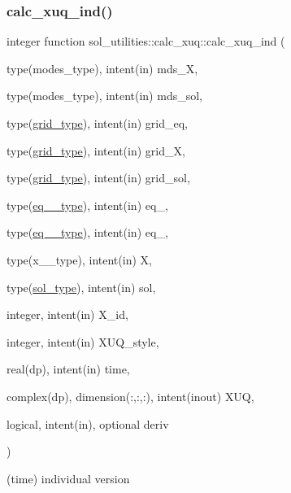 \subsubsection{\texorpdfstring{calc\+\_\+xuq\+\_\+ind()}{calc\_xuq\_ind()}}
{\footnotesize\ttfamily integer function sol\+\_\+utilities\+::calc\+\_\+xuq\+::calc\+\_\+xuq\+\_\+ind (\begin{DoxyParamCaption}\item[{type(modes\+\_\+type), intent(in)}]{mds\+\_\+X,  }\item[{type(modes\+\_\+type), intent(in)}]{mds\+\_\+sol,  }\item[{type(\hyperlink{structgrid__vars_1_1grid__type}{grid\+\_\+type}), intent(in)}]{grid\+\_\+eq,  }\item[{type(\hyperlink{structgrid__vars_1_1grid__type}{grid\+\_\+type}), intent(in)}]{grid\+\_\+X,  }\item[{type(\hyperlink{structgrid__vars_1_1grid__type}{grid\+\_\+type}), intent(in)}]{grid\+\_\+sol,  }\item[{type(\hyperlink{structeq__vars_1_1eq__1__type}{eq\+\_\+1\+\_\+type}), intent(in)}]{eq\+\_,  }\item[{type(\hyperlink{structeq__vars_1_1eq__2__type}{eq\+\_\+2\+\_\+type}), intent(in)}]{eq\+\_,  }\item[{type(x\+\_\+1\+\_\+type), intent(in)}]{X,  }\item[{type(\hyperlink{structsol__vars_1_1sol__type}{sol\+\_\+type}), intent(in)}]{sol,  }\item[{integer, intent(in)}]{X\+\_\+id,  }\item[{integer, intent(in)}]{X\+U\+Q\+\_\+style,  }\item[{real(dp), intent(in)}]{time,  }\item[{complex(dp), dimension(\+:,\+:,\+:), intent(inout)}]{X\+UQ,  }\item[{logical, intent(in), optional}]{deriv }\end{DoxyParamCaption})}



(time) individual version 


